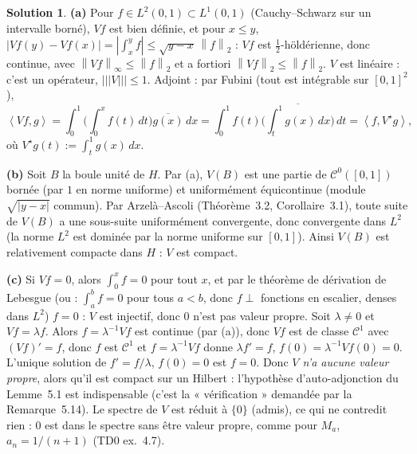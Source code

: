 \documentclass[11pt,a4paper]{article}
\newcommand{\norm}[1]{\left\|#1\right\|}
\newcommand{\opnorm}[1]{|\!|\!|#1|\!|\!|}
\newcommand{\Cz}{\mathcal{C}^0}
\newcommand{\ps}[2]{\left\langle #1,#2\right\rangle}
\theoremstyle{definition}
\newtheorem*{solution}{Solution}
\begin{document}
\begin{solution}
\noindent\textbf{(a)} Pour $f\in L^2(0,1)\subset L^1(0,1)$ (Cauchy--Schwarz sur un intervalle borné), $Vf$ est bien définie, et pour $x\le y$, $|Vf(y)-Vf(x)|=|\int_x^yf|\le\sqrt{y-x}\,\norm f_2$ : $Vf$ est $\frac12$-höldérienne, donc continue, avec $\norm{Vf}_\infty\le\norm f_2$ et a fortiori $\norm{Vf}_2\le\norm f_2$. $V$ est linéaire : c'est un opérateur, $\opnorm V\le1$. Adjoint : par Fubini (tout est intégrable sur $[0,1]^2$),
\[
\ps{Vf}g=\int_0^1\Big(\int_0^xf(t)\,dt\Big)\overline{g(x)}\,dx=\int_0^1f(t)\overline{\Big(\int_t^1g(x)\,dx\Big)}\,dt=\ps f{V^\star g},
\]
où $V^\star g(t):=\int_t^1g(x)\,dx$.

\medskip
\noindent\textbf{(b)} Soit $B$ la boule unité de $H$. Par (a), $V(B)$ est une partie de $\Cz([0,1])$ bornée (par $1$ en norme uniforme) et uniformément équicontinue (module $\sqrt{|y-x|}$ commun). Par Arzelà--Ascoli (Théorème~3.2, Corollaire~3.1), toute suite de $V(B)$ a une sous-suite uniformément convergente, donc convergente dans $L^2$ (la norme $L^2$ est dominée par la norme uniforme sur $[0,1]$). Ainsi $V(B)$ est relativement compacte dans $H$ : $V$ est compact.

\medskip
\noindent\textbf{(c)} Si $Vf=0$, alors $\int_0^xf=0$ pour tout $x$, et par le théorème de dérivation de Lebesgue (ou : $\int_a^bf=0$ pour tous $a<b$, donc $f\perp$ fonctions en escalier, denses dans $L^2$) $f=0$ : $V$ est injectif, donc $0$ n'est pas valeur propre. Soit $\lambda\ne0$ et $Vf=\lambda f$. Alors $f=\lambda^{-1}Vf$ est continue (par (a)), donc $Vf$ est de classe $\mathcal C^1$ avec $(Vf)'=f$, donc $f$ est $\mathcal C^1$ et $f=\lambda^{-1}Vf$ donne $\lambda f'=f$, $f(0)=\lambda^{-1}Vf(0)=0$. L'unique solution de $f'=f/\lambda$, $f(0)=0$ est $f=0$. Donc \emph{$V$ n'a aucune valeur propre}, alors qu'il est compact sur un Hilbert : l'hypothèse d'auto-adjonction du Lemme~5.1 est indispensable (c'est la « vérification » demandée par la Remarque~5.14). Le spectre de $V$ est réduit à $\{0\}$ (admis), ce qui ne contredit rien : $0$ est dans le spectre sans être valeur propre, comme pour $M_a$, $a_n=1/(n+1)$ (TD0 ex.~4.7).


\end{solution}
\end{document}

